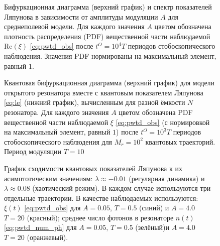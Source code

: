 \begin{figure}[h]
	\caption[Бифуркационная диаграмма и спектр показателей Ляпунова в зависимости от амплитуды модуляции в среднеполевой модели квантового резонатора с утечкой]{
		Бифуркационная диаграмма (верхний график) и спектр показателей Ляпунова \cite{Benettin1976} в зависимости от амплитуды модуляции $A$ для среднеполевой модели. Для каждого значения $A$ цветом обозначена плотность распределения (PDF) вещественной части наблюдаемой $\text{Re}(\xi)$ \cref{eq:pwtd_obs} после \(t^O = 10^4T\) периодов стобоскопического наблюдения. Значения PDF нормированы на максимальный элемент, равный $1$.
	}
	\label{fig:pwtd_1}
\end{figure}

\begin{figure}[h]
	\caption[Квантовая бифуркационная диаграмма для модели открытого резонатора вместе с квантовым показателем Ляпунова]{
		Квантовая бифуркационная диаграмма (верхний график) для модели открытого резонатора вместе с квантовым показателем Ляпунова \cref{eq:le} (нижний график), вычисленным для разной ёмкости $N$ резонатора. 
		Для каждого значения $A$ цветом обозначена PDF вещественной части наблюдаемой $\xi$ \cref{eq:pwtd_obs} (с нормировкой на максимальный элемент, равный $1$) после \(t^O = 10^3T\) периодов стобоскопического наблюдения для $M_r=10^2$ квантовых траекторий. Период модуляции $T=10$
	}
	\label{fig:pwtd_2}
\end{figure}

\begin{figure}[h]
	\caption[График сходимости квантовых показателей Ляпунова к их асимптотическим значениям для разных наблюдаемых в модели открытого резонатора]{
		График сходимости квантовых показателей Ляпунова к их асимптотическим значениям: $\lambda \approx -0.01$ (регулярная динамика) и $\lambda \approx 0.08$ (хаотический режим). В каждом случае используются три отдельные траектории.
		В качестве наблюдаемых используются: $\xi(t)$ \cref{eq:pwtd_obs} для $A = 0.05$, $T = 0.5$ (синий) и $A = 4.0$ $T = 20$ (красный); среднее число фотонов в резонаторе $n(t)$ \cref{eq:pwtd_num_ph} для $A = 0.05$, $T = 0.5$ (зелёный)и $A = 4.0$ $T = 20$ (оранжевый).
	}
	\label{fig:pwtd_3}
\end{figure}

